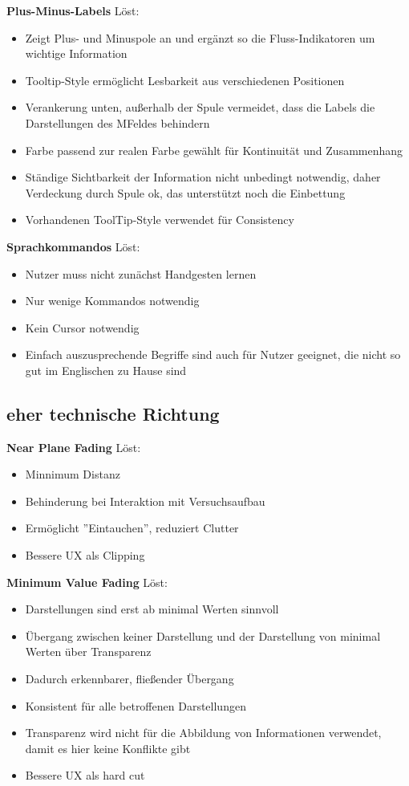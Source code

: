 \textbf{Plus-Minus-Labels}
Löst: 
\begin{itemize}
	\item Zeigt Plus- und Minuspole an und ergänzt so die Fluss-Indikatoren um wichtige Information
	\item Tooltip-Style ermöglicht Lesbarkeit aus verschiedenen Positionen
	\item Verankerung unten, außerhalb der Spule vermeidet, dass die Labels die Darstellungen des MFeldes behindern
	\item Farbe passend zur realen Farbe gewählt für Kontinuität und Zusammenhang
	\item Ständige Sichtbarkeit der Information nicht unbedingt notwendig, daher Verdeckung durch Spule ok, das unterstützt noch die Einbettung
	\item Vorhandenen ToolTip-Style verwendet für Consistency
\end{itemize}

\textbf{Sprachkommandos}
Löst: 
\begin{itemize}
	\item Nutzer muss nicht zunächst Handgesten lernen
	\item Nur wenige Kommandos notwendig
	\item Kein Cursor notwendig
	\item Einfach auszusprechende Begriffe sind auch für Nutzer geeignet, die nicht so gut im Englischen zu Hause sind
\end{itemize}

\subsection{eher technische Richtung}

\textbf{Near Plane Fading}
Löst: 
\begin{itemize}
	\item Minnimum Distanz
	\item Behinderung bei Interaktion mit Versuchsaufbau
	\item Ermöglicht ''Eintauchen'', reduziert Clutter
	\item Bessere UX als Clipping
\end{itemize}

\textbf{Minimum Value Fading}
Löst: 
\begin{itemize}
	\item Darstellungen sind erst ab minimal Werten sinnvoll
	\item Übergang zwischen keiner Darstellung und der Darstellung von minimal Werten über Transparenz
	\item Dadurch erkennbarer, fließender Übergang
	\item Konsistent für alle betroffenen Darstellungen
	\item Transparenz wird nicht für die Abbildung von Informationen verwendet, damit es hier keine Konflikte gibt
	\item Bessere UX als hard cut
\end{itemize}

